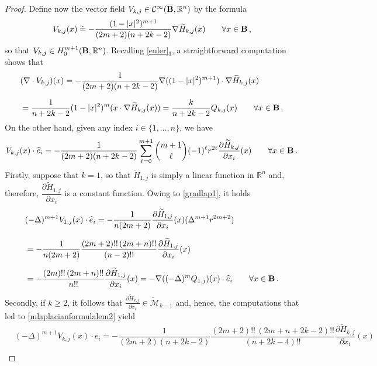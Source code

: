 \documentclass[11pt]{article}
\theoremstyle{plain}
\theoremstyle{definition}
\numberwithin{equation}{section}
\newcommand{\B}{{\bf B}}
\begin{document}
\begin{proof}
Define now the vector field $V_{k,j} \in \mathcal{C}^{\infty}(\overline{\B}, \mathbb{R}^{n})$ by the formula
	$$
	V_{k,j}(x) \doteq -\dfrac{(1 - |x|^{2})^{m+1} }{(2m+2)(n+2k-2)} \nabla \widetilde{H}_{k,j}(x) \qquad \forall x \in \B \, ,
	$$
	so that $V_{k,j} \in H^{m+1}_{0}(\B, \mathbb{R}^{n})$. Recalling \eqref{euler}$_3$, a straightforward computation shows that
	\begin{equation} \label{binomial0}
		\begin{aligned}	
		& (\nabla \cdot V_{k,j})(x) = -\dfrac{1}{(2m+2)(n+2k-2)} \nabla ((1 - |x|^{2})^{m+1}) \cdot \nabla \widetilde{H}_{k,j}(x) \\[6pt]
		& = \dfrac{1}{n+2k-2} (1 - |x|^{2})^{m} (x \cdot \nabla \widetilde{H}_{k,j}(x)) = \dfrac{k}{n+2k-2} Q_{k,j}(x) \qquad \forall x \in \B \, .
		\end{aligned}
	\end{equation}
On the other hand, given any index $i \in \{1,\ldots,n\}$, we have
$$
V_{k,j}(x) \cdot \widehat{e}_{i} = -\dfrac{1}{(2m+2)(n+2k-2)} \sum_{\ell=0}^{m+1} {m+1 \choose \ell} (-1)^{\ell} r^{2\ell} \dfrac{\partial \widetilde{H}_{k,j}}{\partial x_{i}}(x) \qquad \forall x \in \B \, .
$$
Firstly, suppose that $k=1$, so that $\widetilde{H}_{1,j}$ is simply a linear function in $\mathbb{R}^{n}$ and, therefore, $\dfrac{\partial \widetilde{H}_{1,j}}{\partial x_{i}}$ is a constant function. Owing to \eqref{gradlap1}, it holds
\begin{equation} \label{binomial1}
\begin{aligned}
& (- \Delta)^{m+1} V_{1,j}(x) \cdot \widehat{e}_{i} = -\dfrac{1}{n(2m+2)} \dfrac{\partial \widetilde{H}_{1,j}}{\partial x_{i}}(x) (\Delta^{m+1} r^{2m+2}) \\[6pt]
& = -\dfrac{1}{n(2m+2)} \dfrac{(2m+2)!! \, (2m+n)!!}{(n-2)!!} \dfrac{\partial \widetilde{H}_{1,j}}{\partial x_{i}}(x) \\[6pt]
& = - \dfrac{(2m)!! \, (2m+n)!!}{n!!} \dfrac{\partial \widetilde{H}_{1,j}}{\partial x_{i}}(x)  = - \nabla ((- \Delta)^{m} Q_{1,j})(x) \cdot \widehat{e}_{i} \qquad \forall x \in \B \, .
\end{aligned}
\end{equation}
Secondly, if $k \geq 2$, it follows that $\tfrac{\partial \widetilde{H}_{k,j}}{\partial x_{i}} \in \widetilde{\mathcal M}_{k-1}$
and, hence, the computations that led to \eqref{mlaplacianformulalem2} yield
\begin{equation} \label{binomial2}
	\begin{aligned}
		& (- \Delta)^{m+1} V_{k,j}(x) \cdot \widehat{e}_{i} = -\dfrac{1}{(2m+2)(n+2k-2)} \dfrac{(2m+2)!! \, (2m+n+2k-2)!!}{(n+2k-4)!!} \dfrac{\partial \widetilde{H}_{k,j}}{\partial x_{i}}(x) \\[6pt]

\end{aligned}
\end{equation}
\end{proof}
\end{document}
